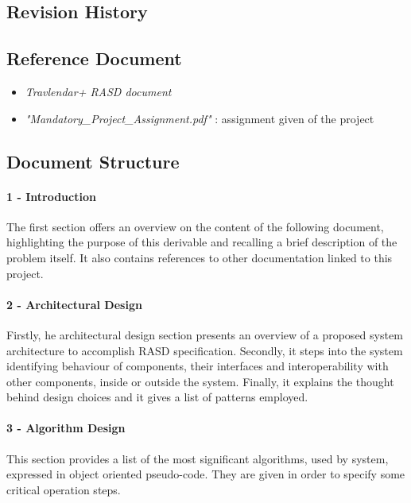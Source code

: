 \subsection{Revision History}


\subsection{Reference Document}

\begin{itemize}
	\item \textsl{Travlendar+ RASD document}
	\item \textsl{"Mandatory\_Project\_Assignment.pdf" }: assignment given of the project
	
\end{itemize}

\subsection{Document Structure}



	\paragraph*{1 - Introduction} 
	The first section offers an overview on the content of the following document, highlighting the purpose of this derivable and recalling a brief description of the problem itself. It also contains references to other documentation linked to this project.

	\paragraph*{2 - Architectural Design} 
	Firstly, he architectural design section presents an overview of a proposed system architecture to accomplish RASD specification. 
	\newline
	Secondly, it steps into the system identifying behaviour of components, their interfaces and interoperability with other components, inside or outside the system. 
	\newline
	Finally, it explains the thought behind design choices and it gives a list of patterns employed.

	\paragraph*{3 - Algorithm Design}
	This section provides a list of the most significant algorithms, used by system, expressed in object oriented pseudo-code. They are given in order to specify some critical operation steps.

